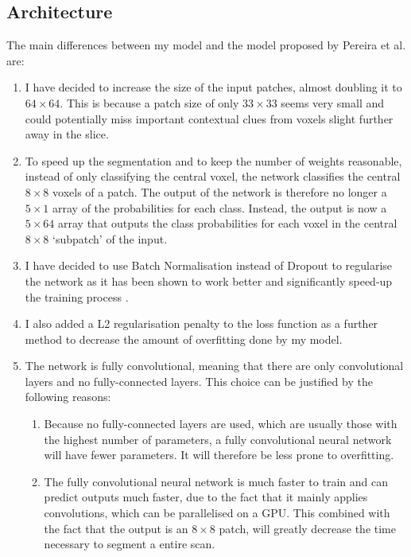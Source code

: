 \documentclass[12pt,a4paper,twoside,openright]{report}
\begin{document}
\subsection{Architecture}
The main differences between my model and the model proposed by Pereira et al. \cite{pereira} are: 
\begin{enumerate}
	\item I have decided to increase the size of the input patches, almost doubling it to $64 \times 64$. This is because a patch size of only $33 \times 33$ seems very small and could potentially miss important contextual clues from voxels slight further away in the slice.
	\item To speed up the segmentation and to keep the number of weights reasonable, instead of only classifying the central voxel, the network classifies the central $8 \times 8$ voxels of a patch. The output of the network is therefore no longer a $5 \times 1$ array of the probabilities for each class. Instead, the output is now a $5 \times 64$ array that outputs the class probabilities for each voxel in the central $8 \times 8$ `subpatch' of the input. 
	\item I have decided to use Batch Normalisation instead of Dropout to regularise the network as it has been shown to work better and significantly speed-up the training process \cite{batch_normalization}. 
	\item I also added a L2 regularisation penalty to the loss function as a further method to decrease the amount of overfitting done by my model.
	\item The network is fully convolutional, meaning that there are only convolutional layers and no fully-connected layers. This choice can be justified by the following reasons:
	\begin{enumerate}
		\item Because no fully-connected layers are used, which are usually those with the highest number of parameters, a fully convolutional neural network will have fewer parameters. It will therefore be less prone to overfitting.
		\item The fully convolutional neural network is much faster to train and can predict outputs much faster, due to the fact that it mainly applies convolutions, which can be parallelised on a GPU. This combined with the fact that the output is an $8 \times 8$ patch, will greatly decrease the time necessary to segment a entire scan.
	\end{enumerate}
\end{enumerate}
\end{document}
